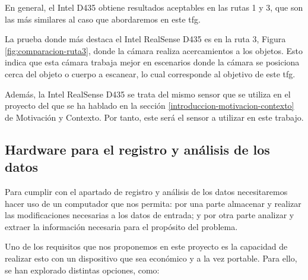 En general, el Intel D435 obtiene resultados aceptables en las rutas 1 y 3, que son las más similares al caso que abordaremos en este \gls{tfg}.

La prueba donde más destaca el Intel RealSense D435 es en la ruta 3, Figura \ref{fig:comparacion-ruta3}, donde la cámara realiza acercamientos a los objetos.
Esto indica que esta cámara trabaja mejor en escenarios donde la cámara se posiciona cerca del objeto o cuerpo a escanear, lo cual corresponde al objetivo de este \gls{tfg}.

Además, la Intel RealSense D435 se trata del mismo sensor que se utiliza en el proyecto \cite{Tech4DietResultados} del que se ha hablado en la sección \ref{introduccion-motivacion-contexto} de Motivación y Contexto.
Por tanto, este será el sensor a utilizar en este trabajo.

\subsection{Hardware para el registro y análisis de los datos}

Para cumplir con el apartado de registro y análisis de los datos necesitaremos hacer uso de un computador que nos permita:
por una parte almacenar y realizar las modificaciones necesarias a los datos de entrada;
y por otra parte analizar y extraer la información necesaria para el propósito del problema.

Uno de los requisitos que nos proponemos en este proyecto es la capacidad de realizar esto con un dispositivo que sea económico y a la vez portable.
Para ello, se han explorado distintas opciones, como:


